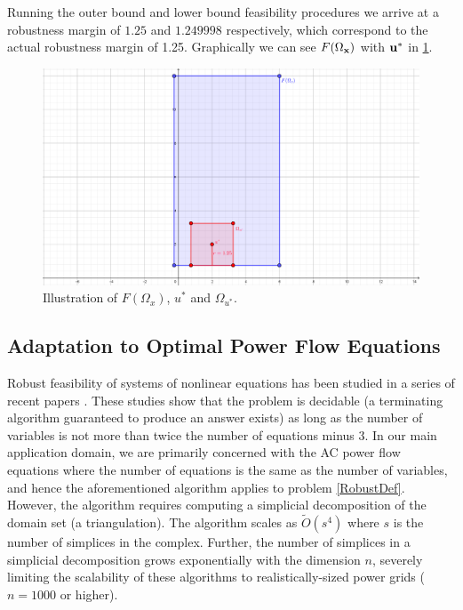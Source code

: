Running the outer bound and lower bound feasibility procedures we arrive at a robustness margin of $1.25$ and $1.249998$ respectively, which correspond to the actual robustness margin of 1.25. 
Graphically we can see $F(\Omega_{\mathbf{x}})$ with $\mathbf{u}^*$ in \cref{fig:FOmega}.

\begin{figure}[htp!]
	\begin{center}
		\includegraphics[scale=0.45]{Figures/FOmega2} %
	\end{center}
	\caption{Illustration of $F(\Omega_x)$, $u^*$ and $\Omega_{u^*}$.}
	\label{fig:FOmega}
\end{figure}



\subsection{Adaptation to Optimal Power Flow Equations}
Robust feasibility of systems of nonlinear equations has been studied in a series of recent papers \cite{FrKr2015,FrKrWa2016}.
These studies show that the problem is decidable (a terminating algorithm guaranteed to produce an answer exists) as long as the number of variables is not more than twice the number of equations minus $3$.
In our main application domain, we are primarily concerned with the AC power flow equations
where the number of equations is the same as the number of variables, and hence the aforementioned algorithm \cite{FrKr2015,FrKrWa2016} applies to problem \ref{RobustDef}.
However, the algorithm requires computing a simplicial decomposition of the domain set (a triangulation).
The algorithm scales as $\tilde{O}(s^4)$ where $s$ is the number of simplices in the complex.
Further, the number of simplices in a simplicial decomposition grows exponentially with the dimension $n$, severely limiting the scalability of these algorithms to realistically-sized power grids ($n=1000$ or higher).

